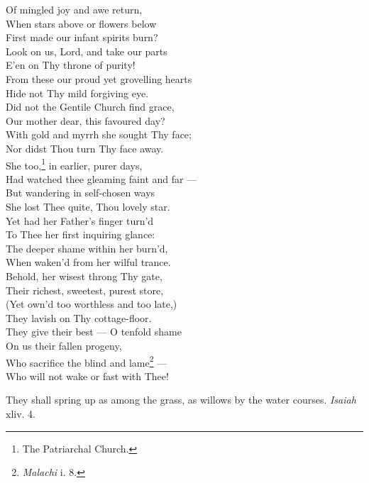  Of mingled joy and awe return, \\
 When stars above or flowers below \\
 First made our infant spirits burn? \\
  Look on us, Lord, and take our parts \\
 E’en on Thy throne of purity! \\
 From these our proud yet grovelling hearts \\
 Hide not Thy mild forgiving eye. \\
  Did not the Gentile Church find grace, \\
 Our mother dear, this favoured day? \\
 With gold and myrrh she sought Thy face; \\
 Nor didst Thou turn Thy face away. \\
  She too,\footnote{The Patriarchal Church.} in earlier, purer days, \\
 Had watched thee gleaming faint and far — \\
 But wandering in self-chosen ways \\
 She lost Thee quite, Thou lovely star. \\
  Yet had her Father’s finger turn’d \\
 To Thee her first inquiring glance: \\
 The deeper shame within her burn’d, \\
 When waken’d from her wilful trance. \\
  Behold, her wisest throng Thy gate, \\
 Their richest, sweetest, purest store, \\
 (Yet own’d too worthless and too late,) \\
 They lavish on Thy cottage-floor. \\
  They give their best — O tenfold shame \\
 On us their fallen progeny, \\
 Who sacrifice the blind and lame\footnote{\emph{Malachi} i. 8.} — \\
 Who will not wake or fast with Thee!\\


They shall spring up as among the grass, as willows by the water courses. \emph{Isaiah} xliv. 4.

